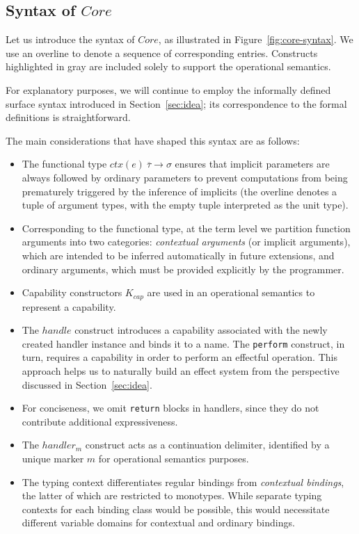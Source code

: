 \documentclass[acmsmall,review,screen]{acmart}
\newcommand{\ctx}[1]{ctx(#1)~}
\begin{document}
\subsection{Syntax of $Core$} \label{subsec:syntax-core}

Let us introduce the syntax of $Core$, as illustrated in Figure~\ref{fig:core-syntax}.
We use an overline to denote a sequence of corresponding entries.
Constructs highlighted in gray are included solely to support the operational semantics.

For explanatory purposes, we will continue to employ the informally defined surface syntax introduced in Section~\ref{sec:idea}; its correspondence to the formal definitions is straightforward.

The main considerations that have shaped this syntax are as follows:
\begin{itemize}
    \item The functional type $\ctx{e}\overline{\tau}\to\sigma$ ensures that implicit parameters are always followed by ordinary parameters to prevent computations from being prematurely triggered by the inference of implicits (the overline denotes a tuple of argument types, with the empty tuple interpreted as the unit type).
    \item Corresponding to the functional type, at the term level we partition function arguments into two categories: \emph{contextual arguments} (or implicit arguments), which are intended to be inferred automatically in future extensions, and ordinary arguments, which must be provided explicitly by the programmer.
    \item Capability constructors $K_{cap}$ are used in an operational semantics to represent a capability.
    \item  The $handle$ construct introduces a capability associated with the newly created handler instance and binds it to a name.
    The \texttt{perform} construct, in turn, requires a capability in order to perform an effectful operation.
    This approach helps us to naturally build an effect system from the perspective discussed in Section~\ref{sec:idea}.
    \item For conciseness, we omit \texttt{return} blocks in handlers, since they do not contribute additional expressiveness.
    \item The $handler_m$ construct acts as a continuation delimiter, identified by a unique marker $m$ for operational semantics purposes.
    \item The typing context differentiates regular bindings from \emph{contextual bindings}, the latter of which are restricted to monotypes.
    While separate typing contexts for each binding class would be possible, this would necessitate different variable domains for contextual and ordinary bindings.
\end{itemize}
\end{document}

